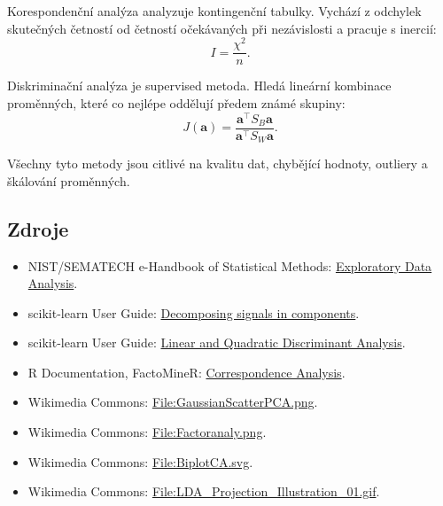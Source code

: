Korespondenční analýza analyzuje kontingenční tabulky. Vychází z odchylek skutečných četností od četností
očekávaných při nezávislosti a pracuje s inercií:
\[
I=\frac{\chi^2}{n}.
\]

Diskriminační analýza je supervised metoda. Hledá lineární kombinace proměnných, které co nejlépe oddělují
předem známé skupiny:
\[
J(\mathbf{a})
=
\frac{\mathbf{a}^\top S_B\mathbf{a}}
{\mathbf{a}^\top S_W\mathbf{a}}.
\]

Všechny tyto metody jsou citlivé na kvalitu dat, chybějící hodnoty, outliery a škálování proměnných.

\subsection{Zdroje}
\begin{itemize}
    \item NIST/SEMATECH e-Handbook of Statistical Methods:
    \href{https://itl.nist.gov/div898/handbook/eda/eda.htm}{Exploratory Data Analysis}.
    \item scikit-learn User Guide:
    \href{https://scikit-learn.org/stable/modules/decomposition.html}{Decomposing signals in components}.
    \item scikit-learn User Guide:
    \href{https://scikit-learn.org/stable/modules/lda_qda.html}{Linear and Quadratic Discriminant Analysis}.
    \item R Documentation, FactoMineR:
    \href{https://search.r-project.org/CRAN/refmans/FactoMineR/html/CA.html}{Correspondence Analysis}.
    \item Wikimedia Commons:
    \href{https://commons.wikimedia.org/wiki/File:GaussianScatterPCA.png}{File:GaussianScatterPCA.png}.
    \item Wikimedia Commons:
    \href{https://commons.wikimedia.org/wiki/File:Factoranaly.png}{File:Factoranaly.png}.
    \item Wikimedia Commons:
    \href{https://commons.wikimedia.org/wiki/File:BiplotCA.svg}{File:BiplotCA.svg}.
    \item Wikimedia Commons:
    \href{https://commons.wikimedia.org/wiki/File:LDA\_Projection\_Illustration\_01.gif}{File:LDA\_Projection\_Illustration\_01.gif}.
\end{itemize}

\newpage
